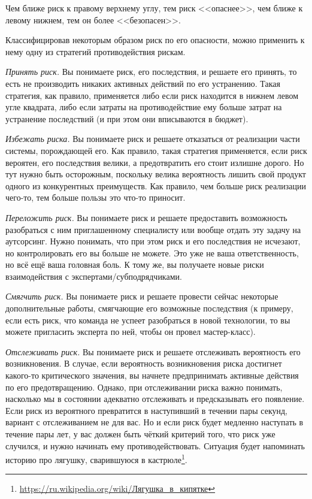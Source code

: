 \documentclass{../../text-style}
\begin{document}
Чем ближе риск к правому верхнему углу, тем риск <<опаснее>>, чем ближе к левому нижнем, тем он более <<безопасен>>.

Классифицировав некоторым образом риск по его опасности, можно применить к нему одну из стратегий противодействия рискам.

\emph{Принять риск.} Вы понимаете риск, его последствия, и решаете его принять, то есть не производить никаких активных действий по его устранению. Такая стратегия, как правило, применяется либо если риск находится в нижнем левом угле квадрата, либо если затраты на противодействие ему больше затрат на устранение последствий (и при этом они вписываются в бюджет).

\emph{Избежать риска.} Вы понимаете риск и решаете отказаться от реализации части системы, порождающей его. Как правило, такая стратегия применяется, если риск вероятен, его последствия велики, а предотвратить его стоит излишне дорого. Но тут нужно быть осторожным, поскольку велика вероятность лишить свой продукт одного из конкурентных преимуществ. Как правило, чем больше риск реализации чего-то, тем больше пользы это что-то приносит.

\emph{Переложить риск.} Вы понимаете риск и решаете предоставить возможность разобраться с ним приглашенному специалисту или вообще отдать эту задачу на аутсорсинг. Нужно понимать, что при этом риск и его последствия не исчезают, но контролировать его вы больше не можете. Это уже не ваша ответственность, но всё ещё ваша головная боль. К тому же, вы получаете новые риски взаимодействия с экспертами/субподрядчиками.

\emph{Смягчить риск.} Вы понимаете риск и решаете провести сейчас некоторые дополнительные работы, смягчающие его возможные последствия (к примеру, если есть риск, что команда не успеет разобраться в новой технологии, то вы можете пригласить эксперта по ней, чтобы он провел мастер-класс).

\emph{Отслеживать риск.} Вы понимаете риск и решаете отслеживать вероятность его возникновения. В случае, если вероятность возникновения риска достигнет какого-то критического значения, вы начнете предпринимать активные действия по его предотвращению. Однако, при отслеживании риска важно понимать, насколько мы в состоянии адекватно отслеживать и предсказывать его появление. Если риск из вероятного превратится в наступивший в течении пары секунд, вариант с отслеживанием не для вас. Но и если риск будет медленно наступать в течение пары лет, у вас должен быть чёткий критерий того, что риск уже случился, и нужно начинать ему противодействовать. Ситуация будет напоминать историю про лягушку, сварившуюся в кастрюле\footnote{\url{https://ru.wikipedia.org/wiki/Лягушка_в_кипятке}}.
\end{document}

